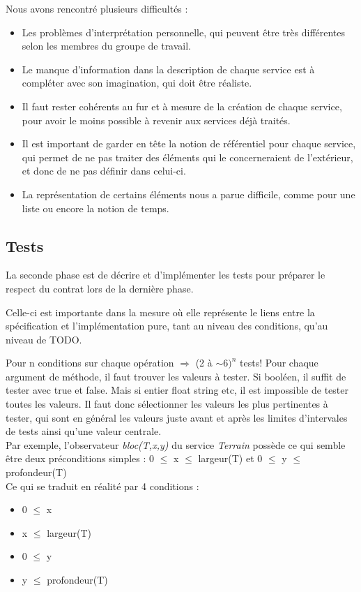 \documentclass[a4paper, 11pt, notitlepage]{article}
\begin{document}
Nous avons rencontré plusieurs difficultés :
\begin{itemize}
\item Les problèmes d’interprétation personnelle, qui peuvent être
  très différentes selon les membres du groupe de travail.
\item Le manque d'information dans la description de chaque service
  est à compléter avec son imagination, qui doit être réaliste.
\item Il faut rester cohérents au fur et à mesure de la création de
  chaque service, pour avoir le moins possible à revenir aux services
  déjà traités. 
\item Il est important de garder en tête la notion de référentiel pour
  chaque service, qui permet de ne pas traiter des éléments qui
  le concerneraient de l'extérieur, et donc de ne pas définir dans celui-ci.

\item La représentation de certains éléments nous a parue difficile,
  comme pour une liste ou encore la notion de temps.
\end{itemize}

\subsection{Tests}
La seconde phase est de décrire et d'implémenter les tests pour préparer
le respect du contrat lors de la dernière phase.

Celle-ci est importante dans la mesure où elle représente le liens
entre la spécification et l'implémentation pure, tant au niveau des
conditions, qu'au niveau de TODO.

Pour n conditions sur chaque opération $\Rightarrow$ (2 à $\sim 6)^n$ tests!
Pour chaque argument de méthode, il faut trouver les valeurs à tester.
Si booléen, il suffit de tester avec true et false.
Mais si entier float string etc, il est impossible de tester toutes
les valeurs. Il faut donc sélectionner les valeurs les plus
pertinentes à tester, qui sont en général les valeurs juste avant et
après les limites d'intervales de tests ainsi qu'une valeur centrale. \\


Par exemple, l'observateur \emph{bloc(T,x,y)} du service \emph{Terrain} possède ce qui semble être deux préconditions simples :  0 $\le$ x $\le$ largeur(T) et 0 $\le$ y $\le$ profondeur(T) \\


Ce qui se traduit en réalité par 4 conditions :
\begin{itemize}
\item 0 $\le$ x 
\item x $\le$ largeur(T)
\item 0 $\le$ y
\item y $\le$ profondeur(T) \\
 
 \end{itemize} 
 
\end{document}
